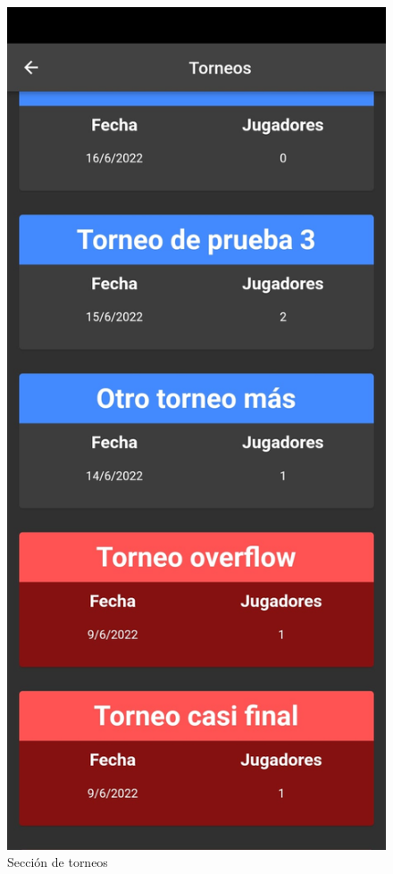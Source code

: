 \documentclass{article}
\begin{document}
\begin{figure}[H]
  \includegraphics[width=\textwidth]{imagenes/torneos.jpeg}
  \caption{Sección de torneos} 
\end{figure} 
\end{document}
